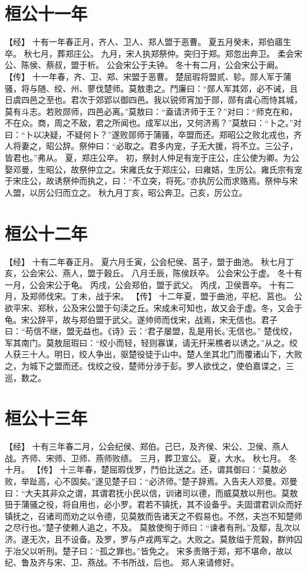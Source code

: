 \documentclass[a4paper,12pt,UTF8,twoside]{ctexbook}
\begin{document}
\chapter{桓公十一年}

【经】
十有一年春正月，齐人、卫人、郑人盟于恶曹。
夏五月癸未，郑伯寤生卒。
秋七月，葬郑庄公。
九月，宋人执郑祭仲。突归于郑。郑忽出奔卫。
柔会宋公、陈侯、蔡叔，盟于析。
公会宋公于夫钟。
冬十有二月，公会宋公于阚。
【传】
十一年春，齐、卫、郑、宋盟于恶曹。
楚屈瑕将盟贰、轸。郧人军于蒲骚，将与随、绞、州、蓼伐楚师。莫敖患之。鬥廉曰：“郧人军其郊，必不诫，且日虞四邑之至也。君次于郊郢以御四邑。我以锐师宵加于郧，郧有虞心而恃其城，莫有斗志。若败郧师，四邑必离。”莫敖曰：“盍请济师于王？”对曰：“师克在和，不在众。商，周之不敌，君之所闻也。成军以出，又何济焉？”莫敖曰：“卜之。”对曰：“卜以决疑，不疑何卜？”遂败郧师于蒲骚，卒盟而还。郑昭公之败北戎也，齐人将妻之，昭公辞。祭仲曰：“必取之。君多内宠，子无大援，将不立。三公子，皆君也。”弗从。
夏，郑庄公卒。
初，祭封人仲足有宠于庄公，庄公使为卿。为公娶邓曼，生昭公，故祭仲立之。宋雍氏女于郑庄公，曰雍姞，生厉公。雍氏宗有宠于宋庄公，故诱祭仲而执之，曰：“不立突，将死。”亦执厉公而求赂焉。祭仲与宋人盟，以厉公归而立之。
秋九月丁亥，昭公奔卫。己亥，厉公立。

\chapter{桓公十二年}

【经】
十有二年春正月。
夏六月壬寅，公会杞侯、莒子，盟于曲池。
秋七月丁亥，公会宋公、燕人，盟于穀丘。
八月壬辰，陈侯跃卒。
公会宋公于虚。
冬十有一月，公会宋公于龟。
丙戌，公会郑伯，盟于武父。
丙戌，卫侯晋卒。
十有二月，及郑师伐宋。丁未，战于宋。
【传】
十二年夏，盟于曲池，平杞、莒也。
公欲平宋、郑秋，公及宋公盟于句渎之丘。宋成未可知也，故又会于虚。冬，又会于龟。宋公辞平，故与郑伯盟于武父。遂帅师而伐宋，战焉，宋无信也。君子曰：“苟信不继，盟无益也。《诗》云：‘君子屡盟，乱是用长。’无信也。”
楚伐绞，军其南门。莫敖屈瑕曰：“绞小而轻，轻则寡谋，请无扞采樵者以诱之。”从之。绞人获三十人。明日，绞人争出，驱楚役徒于山中。楚人坐其北门而覆诸山下，大败之，为城下之盟而还。伐绞之役，楚师分涉于彭。罗人欲伐之，使伯嘉谍之，三巡，数之。

\chapter{桓公十三年}

【经】
十有三年春二月，公会纪侯、郑伯。己巳，及齐侯、宋公、卫侯、燕人战。齐师、宋师、卫师、燕师败绩。
三月，葬卫宣公。
夏，大水。
秋七月。
冬十月。
【传】
十三年春，楚屈瑕伐罗，鬥伯比送之。还，谓其御曰：“莫敖必败，举趾高，心不固矣。”遂见楚子曰：“必济师。”楚子辞焉。入告夫人邓曼。邓曼曰：“大夫其非众之谓，其谓君抚小民以信，训诸司以德，而威莫敖以刑也。莫敖狃于蒲骚之役，将自用也，必小罗。君若不镇抚，其不设备乎。夫固谓君训众而好镇抚之，召诸司而劝之以令德，见莫敖而告诸天之不假易也。不然，夫岂不知楚师之尽行也。”楚子使赖人追之，不及。
莫敖使徇于师曰：“谏者有刑。”及鄢，乱次以济。遂无次，且不设备。及罗，罗与卢戎两军之。大败之。莫敖缢于荒穀，群帅囚于冶父以听刑。楚子曰：“孤之罪也。”皆免之。
宋多责赂于郑，郑不堪命，故以纪、鲁及齐与宋、卫、燕战。不书所战，后也。
郑人来请修好。
\end{document}
